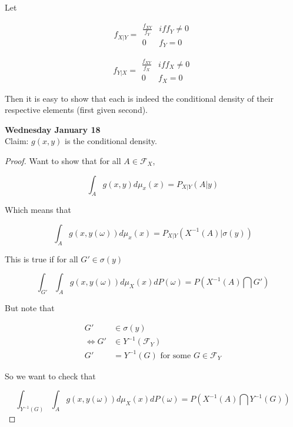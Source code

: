 \documentclass[11pt,fleqn]{book} %
\begin{document}
\begin{enumerate}
		Let

				$$f_{X|Y} = \begin{array}{ll}
				\frac{f_{XY}}{f_Y} & if f_Y \neq 0\\
				0 & f_Y = 0
					
				\end{array} $$

				$$f_{Y|X} = \begin{array}{ll}
				\frac{f_{XY}}{f_X} & if f_X \neq 0\\
				0 & f_X = 0
					
				\end{array} $$

		Then it is easy to show that each is indeed the conditional density of their respective elements (first given second). 
 
\textbf{Wednesday January 18}\\

Claim: $g(x, y)$ is the conditional density. 

\begin{proof}
	Want to show that for all $A \in \mathcal{F}_X$, 

			$$ \int_A g(x, y) d\mu_x(x) = P_{X|Y} (A|y) $$

	Which means that

			$$\int_A g(x, y(\omega)) d\mu_x(x) = P_{X|Y} (X^{-1}(A)|\sigma(y)) $$

	This is true if for all $G' \in \sigma(y)$

			$$\int_{G'} \int_A g(x, y(\omega)) d\mu_X (x) dP(\omega) = P(X^{-1}(A) \bigcap G') $$


	But note that 

				\begin{align*}
					G' &\in \sigma(y)\\
					\Leftrightarrow G' &\in Y^{-1}(\mathcal{F}_Y)\\
					G' &= Y^{-1}(G)\text{ for some } G\in \mathcal{F}_Y
				\end{align*}



	So we want to check that  

			$$\int_{Y^{-1}(G)} \int_A g(x, y(\omega)) d\mu_X (x) dP(\omega) = P(X^{-1}(A) \bigcap Y^{-1}(G)) $$


\end{proof}
\end{enumerate}
\end{document}
